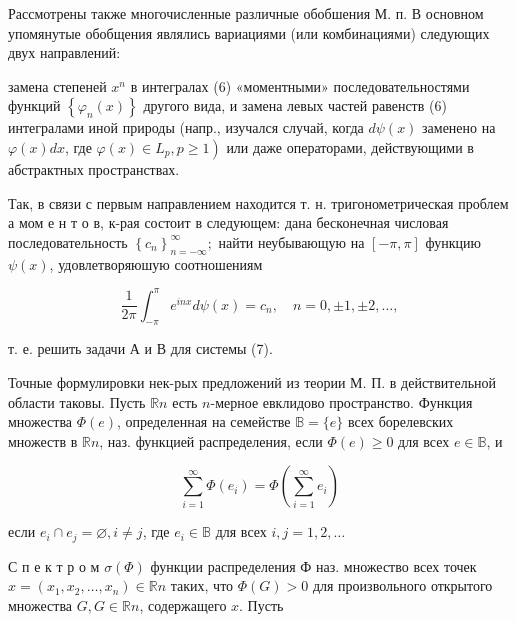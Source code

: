 \documentclass[10pt]{article}
\begin{document}
Рассмотрены также многочисленные различные обобшения М. п. В основном упомянутые обобщения являлись вариациями (или комбинациями) следующих двух направлений:



замена степеней $x^{n}$ в интегралах (6) «моментными» последовательностями функций $\left\{\varphi_{n}(x)\right\}$ другого вида, и замена левых частей равенств (6) интегралами иной природы (напр., изучался случай, когда $d \psi(x)$ заменено на $\varphi(x) d x$, где $\left.\varphi(x) \in L_{p}, p \geqslant 1\right)$ или даже операторами, действующими в абстрактных пространствах.



Так, в связи с первым направлением находится т. н. тригонометрическая проблем а мом е н т о в, к-рая состоит в следующем: дана бесконечная числовая последовательность $\left\{c_{n}\right\}_{n=-\infty}^{\infty} ;$ найти неубывающую на $[-\pi, \pi]$ функцию $\psi(x)$, удовлетворяюшую соотношениям



\[

\frac{1}{2 \pi} \int_{-\pi}^{\pi} e^{i n x} d \psi(x)=c_{n}, \quad n=0, \pm 1, \pm 2, \ldots,

\]



т. е. решить задачи А и В для системы (7).



Точные формулировки нек-рых предложений из теории М. П. в действительной области таковы. Пусть $\mathbb{R} n$ есть $n$-мерное евклидово пространство. Функция множества $\Phi(e)$, определенная на семействе $\mathbb{B}=\{e\}$ всех борелевских множеств в $\mathbb{R} n$, наз. функцией распределения, если $\Phi(e) \geqslant 0$ для всех $e \in \mathbb{B}$, и



\[

\sum_{i=1}^{\infty} \Phi\left(e_{i}\right)=\Phi\left(\sum_{i=1}^{\infty} e_{i}\right)

\]



если $e_{i} \cap e_{j}=\varnothing, i \neq j$, где $e_{i} \in \mathbb{B}$ для всех $i, j=1,2, \ldots$



С п е к т р о м $\sigma(\Phi)$ функции распределения Ф наз. множество всех точек $x=\left(x_{1}, x_{2}, \ldots, x_{n}\right) \in \mathbb{R} n$ таких, что $\Phi(G)>0$ для произвольного открытого множества $G, G \in \mathbb{R} n$, содержащего $x$. Пусть
\end{document}
